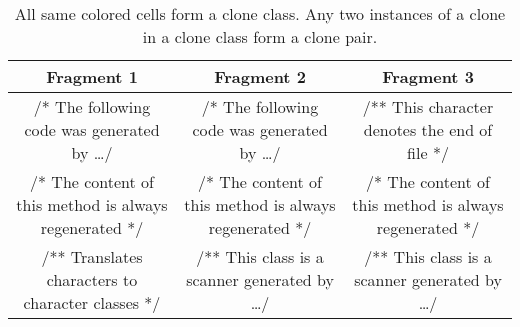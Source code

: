 \setlength{\extrarowheight}{.5em}
\begin{table}
	\caption[Clone pair and clone class.]{All same colored cells form a clone class. Any two instances of a clone in a clone class form a clone pair.}
	\label{table:cloneClass}

%		
%		
	\begin{tabularx}{1.0\textwidth}{C|C|C}
		\textbf{Fragment 1} & \textbf{Fragment 2} & \textbf{Fragment 3} \\
		\hline
		
		/* The following code was generated by \dots */ &
		/* The following code was generated by \dots */ &
		/** This character denotes the end of file */ \\
				
		/* The content of this method is always regenerated */ &
		/* The content of this method is always regenerated */ &
		/* The content of this method is always regenerated */ \\
		
		/** Translates characters to character classes */ &
		 /** This class is a scanner generated by \dots */ &
		 /** This class is a scanner generated by \dots */ \\
	\end{tabularx}
\end{table}